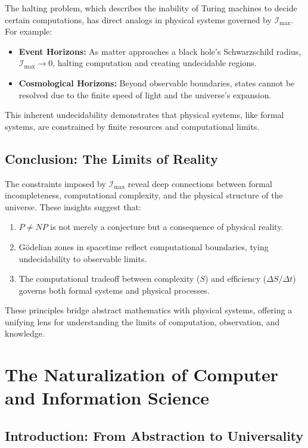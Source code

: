 \documentclass[12pt]{article}
\begin{document}
The halting problem, which describes the inability of Turing machines to decide certain computations, has direct analogs in physical systems governed by $\mathcal{I}_{\text{max}}$. For example:
\begin{itemize}
    \item \textbf{Event Horizons:} As matter approaches a black hole’s Schwarzschild radius, $\mathcal{I}_{\text{max}} \to 0$, halting computation and creating undecidable regions.
    \item \textbf{Cosmological Horizons:} Beyond observable boundaries, states cannot be resolved due to the finite speed of light and the universe’s expansion.
\end{itemize}

This inherent undecidability demonstrates that physical systems, like formal systems, are constrained by finite resources and computational limits.

\subsection{Conclusion: The Limits of Reality}

The constraints imposed by $\mathcal{I}_{\text{max}}$ reveal deep connections between formal incompleteness, computational complexity, and the physical structure of the universe. These insights suggest that:
\begin{enumerate}
    \item $P \neq NP$ is not merely a conjecture but a consequence of physical reality.
    \item Gödelian zones in spacetime reflect computational boundaries, tying undecidability to observable limits.
    \item The computational tradeoff between complexity ($S$) and efficiency ($\Delta S / \Delta t$) governs both formal systems and physical processes.
\end{enumerate}

These principles bridge abstract mathematics with physical systems, offering a unifying lens for understanding the limits of computation, observation, and knowledge.


\section{The Naturalization of Computer and Information Science}

\subsection{Introduction: From Abstraction to Universality}
\end{document}
